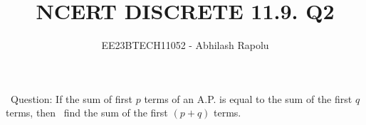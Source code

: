 \documentclass[journal,12pt,twoside]{IEEEtran}  %
\title{NCERT DISCRETE 11.9. Q2}
\author{EE23BTECH11052 - Abhilash Rapolu %
}
\begin{document}
\maketitle
\newpage
\bigskip
\ Question: If the sum of first $p$ terms of an A.P. is equal to the sum of the first $q$ terms, then
 find the sum of the first $(p + q)$ terms.
\end{document}

